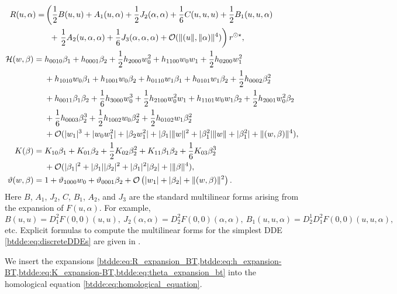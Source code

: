 \begin{align}
R(u,\alpha) = & \label{btdde:eq:R_expansion_BT}
    \left(\frac{1}{2} B(u,u) + A_1(u,\alpha) + \frac{1}{2} J_2(\alpha,\alpha) + \frac{1}{6} C(u,u,u) 
    + \frac{1}{2} B_1(u,u,\alpha) \right. \\
    &\phantom{\Bigl(}+ \left. \frac{1}{2} A_2(u,\alpha,\alpha) + \frac{1}{6} J_3(\alpha,\alpha,\alpha) 
    + \mathcal O(\|(u\|,\|\alpha)\|^4) \right) r^{\odot\star} , \nonumber \\
\mathcal H(w,\beta) = {}& \label{btdde:eq:h_expansion-BT}
    h_{0010}\beta_1 + h_{0001} \beta_2 
    + \frac12 h_{2000}w_0^2 + h_{1100}w_0w_1 + \frac12 h_{0200}w_1^2 \\
    & + h_{1010}w_0\beta_1 + h_{1001}w_0\beta_2 + h_{0110}w_1\beta_1 
    + h_{0101}w_1\beta_2 + \frac12 h_{0002}\beta_2^2\nonumber \\
    & + h_{0011}\beta_1\beta_2 + \frac16 h_{3000}w_0^3 + \frac12 h_{2100}w_0^2w_1 
    + h_{1101}w_0w_1\beta_2 + \frac12 h_{2001}w_0^2\beta_2\nonumber \\
    & + \frac{1}{6}h_{0003}\beta_2^3 + \frac12 h_{1002}w_0\beta_2^2 
    + \frac12 h_{0102}w_1\beta_2^2 \nonumber \\
    & + \mathcal{O}(|w_1|^3 + |w_0w_1^2| + |\beta_2w_1^2| + |\beta_1|\|w\|^2
    +|\beta_1^2|\|w\| + |\beta_1^2| + \|(w,\beta)\|^4), \nonumber \\
K(\beta) = {}& \label{btdde:eq:K_expansion-BT}
    K_{10}\beta_1 + K_{01}\beta_2 + \frac{1}{2}K_{02}\beta_2^{2} 
	+ K_{11}\beta_1\beta_2 + \frac16 K_{03} \beta_2^3 \\
    &+ \mathcal{O}(|\beta_1|^2 + |\beta_1||\beta_2|^2 + |\beta_1|^2|\beta_2|  
	+ |\|\beta\|^4), \nonumber \\
\vartheta(w,\beta) = {}& \label{btdde:eq:theta_expansion_bt}
    1 + \vartheta_{1000}w_0 + \vartheta_{0001} \beta_2 
    + \mathcal O\left(|w_1| + |\beta_2| + \|(w,\beta)\|^2\right).
\end{align}
%
Here $B$, $A_1$, $J_2$, $C$, $B_1$, $A_2$, and $J_3$ are the standard
multilinear forms arising from the expansion of $F(u,\alpha)$. For example,
\[
B(u,u) = D^2_1F(0,0)(u,u),~J_2(\alpha,\alpha) = D_2^2F(0,0)(\alpha,\alpha),~B_1(u,u,\alpha) = D^1_2D^2_1F(0,0)(u,u,\alpha),
\]
etc. Explicit formulas to compute the multilinear forms for the simplest DDE
\cref{btdde:eq:discreteDDEs} are given in \cite[Section 6]{Switching2019}.

We insert the expansions
\cref{btdde:eq:R_expansion_BT,btdde:eq:h_expansion-BT,btdde:eq:K_expansion-BT,btdde:eq:theta_expansion_bt}
into the homological equation \cref{btdde:eq:homological_equation}. 

